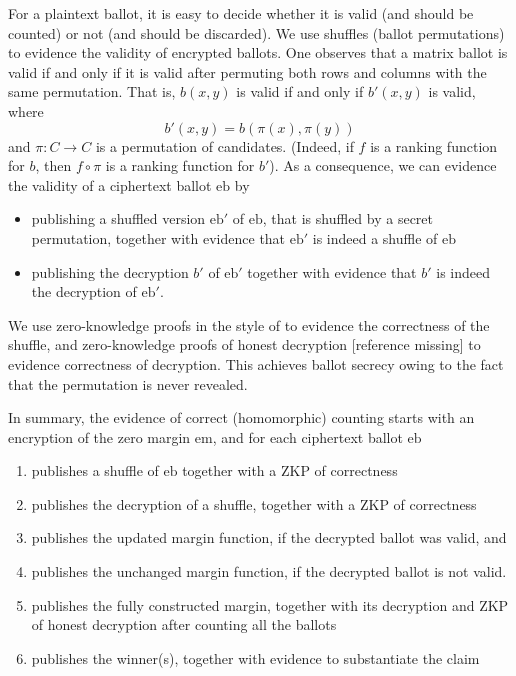 \documentclass{llncs}
\newcommand{\encb}{\mathrm{eb}}
\newcommand{\encm}{\mathrm{em}}
\begin{document}
For a plaintext ballot, it is easy to decide whether it is
valid (and should be counted) or not (and should be discarded). We
use shuffles (ballot permutations) to evidence the validity of
encrypted ballots. One observes that a matrix ballot is valid if and
only if it is valid after permuting both rows and columns with the
same permutation. That is, $b(x,y)$ is valid if and only if $b'(x,y)$
is valid, where
\[ b'(x,y) = b(\pi(x), \pi(y)) \]
and $\pi: C \to C$ is a permutation of candidates. (Indeed, if $f$
is a ranking function for $b$, then $f \circ \pi$ is a ranking
function for $b'$). As a consequence, we can evidence the validity
of a ciphertext ballot $\encb$ by
\begin{itemize}
  \item publishing a shuffled version $\encb'$ of $\encb$, that is
  shuffled by a secret permutation, together with
  evidence that $\encb'$ is indeed a shuffle of $\encb$
  \item publishing the decryption $b'$ of $\encb'$ together with
  evidence that $b'$ is indeed the decryption of $\encb'$.
\end{itemize}

We use zero-knowledge proofs in the style of \cite{DBLP:conf/africacrypt/TereliusW10}
to evidence the correctness of the shuffle, and zero-knowledge
proofs of honest decryption [reference missing] to evidence
correctness of decryption. This achieves ballot secrecy owing to the
fact that the permutation is never revealed.

In summary, the evidence of correct (homomorphic) counting starts
with an encryption of the zero margin $\encm$, and for each
ciphertext ballot $\encb$
\begin{enumerate}
\item publishes a shuffle of $\encb$ together with a ZKP of 
correctness
\item publishes the decryption of a shuffle, together with a ZKP of
correctness
\item publishes the updated margin function, if the decrypted ballot
was valid, and
\item publishes the unchanged margin function, if the decrypted
ballot is not valid.
\item publishes the fully constructed margin, together with its decryption  
  and ZKP of honest decryption after counting all the ballots     
\item publishes the winner(s), together with evidence to substantiate the
    claim
\end{enumerate}
\end{document}
